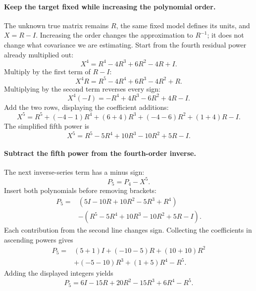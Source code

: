 \documentclass[11pt]{article}
\begin{document}
\paragraph{Keep the target fixed while increasing the polynomial order.}
The unknown true matrix remains $R$, the same fixed model defines its
units, and $X=R-I$. Increasing the order changes the approximation to
$R^{-1}$; it does not change what covariance we are estimating. Start
from the fourth residual power already multiplied out:
\begin{equation}
 X^4=R^4-4R^3+6R^2-4R+I.
\end{equation}
Multiply by the first term of $R-I$:
\begin{equation}
 X^4R=R^5-4R^4+6R^3-4R^2+R.
\end{equation}
Multiplying by the second term reverses every sign:
\begin{equation}
 X^4(-I)=-R^4+4R^3-6R^2+4R-I.
\end{equation}
Add the two rows, displaying the coefficient additions:
\begin{equation}
 X^5=R^5+(-4-1)R^4+(6+4)R^3+(-4-6)R^2+(1+4)R-I.
\end{equation}
The simplified fifth power is
\begin{equation}
 X^5=R^5-5R^4+10R^3-10R^2+5R-I.
\end{equation}

\paragraph{Subtract the fifth power from the fourth-order inverse.}
The next inverse-series term has a minus sign:
\begin{equation}
 P_5=P_4-X^5.
\end{equation}
Insert both polynomials before removing brackets:
\begin{equation}
 \begin{split}
 P_5={}&(5I-10R+10R^2-5R^3+R^4)\\
       &-(R^5-5R^4+10R^3-10R^2+5R-I).
 \end{split}
\end{equation}
Each contribution from the second line changes sign. Collecting the
coefficients in ascending powers gives
\begin{equation}
 \begin{split}
 P_5={}&(5+1)I+(-10-5)R+(10+10)R^2\\
       &+(-5-10)R^3+(1+5)R^4-R^5.
 \end{split}
\end{equation}
Adding the displayed integers yields
\begin{equation}
 P_5=6I-15R+20R^2-15R^3+6R^4-R^5.
\end{equation}
\end{document}
